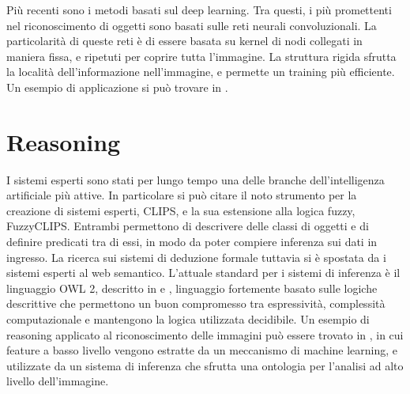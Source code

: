 Più recenti sono i metodi basati sul deep learning. Tra questi, i più promettenti nel riconoscimento di oggetti sono basati sulle reti neurali convoluzionali. La particolarità di queste reti è di essere basata su kernel di nodi collegati in maniera fissa, e ripetuti per coprire tutta l'immagine. La struttura rigida sfrutta la località dell'informazione nell'immagine, e permette un training più efficiente.
Un esempio di applicazione si può trovare in \cite{NIPS2012_4824}.


\section{Reasoning}

I sistemi esperti sono stati per lungo tempo una delle branche dell'intelligenza artificiale più attive. 
In particolare si può citare il noto strumento per la creazione di sistemi esperti, CLIPS, e la sua estensione alla logica fuzzy, FuzzyCLIPS. Entrambi permettono di descrivere delle classi di oggetti e di definire predicati tra di essi, in modo da poter compiere inferenza sui dati in ingresso.
La ricerca sui sistemi di deduzione formale tuttavia si è spostata da i sistemi esperti al web semantico.
L'attuale standard per i sistemi di inferenza è il linguaggio OWL 2, descritto in \cite{owl2-overview} e \cite{owl2-primer}, linguaggio fortemente basato sulle logiche descrittive che permettono un buon compromesso tra espressività, complessità computazionale e mantengono la logica utilizzata decidibile.
Un esempio di reasoning applicato al riconoscimento delle immagini può essere trovato in \cite{DBLP:journals/ivc/MaillotT08}, in cui feature a basso livello vengono estratte da un meccanismo di machine learning, e utilizzate da un sistema di inferenza che sfrutta una ontologia per l'analisi ad alto livello dell'immagine.
